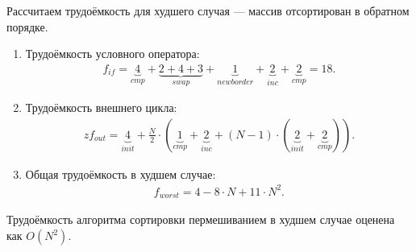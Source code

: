 Рассчитаем трудоёмкость для худшего случая --- массив отсортирован в обратном порядке.
\begin{enumerate}
	\item Трудоёмкость условного оператора:
	\begin{equation}
		\begin{gathered}
			f_{if} = \underbrace{4}_{cmp} + \underbrace{2+4+3}_{swap} + \underbrace{1}_{newborder} + \underbrace{2}_{inc} + \underbrace{2}_{cmp} = 18.
		\end{gathered}
	\end{equation}
	\item Трудоёмкость внешнего цикла:
	\begin{equation}
		\begin{gathered}z
			f_{out} = \underbrace{4}_{init} + \frac{N}{2} \cdot (\underbrace{1}_{cmp} + 	\underbrace{2}_{inc} + (N-1) \cdot (\underbrace{2}_{init} + \underbrace{2}_{cmp})).
		\end{gathered}
	\end{equation}
	\item Общая трудоёмкость в худшем случае:
	\begin{equation}
		\begin{gathered}
			f_{worst} = 4 - 8 \cdot N + 11 \cdot N^2.
		\end{gathered}
	\end{equation}
\end{enumerate}	

Трудоёмкость алгоритма сортировки пермешиванием в худшем случае оценена как $O(N^2)$.

